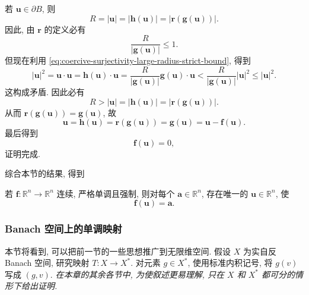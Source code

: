 \begin{Proof}
若 $\bm{u}\in\partial B$, 则
\begin{equation}\label{eq:coercive-surjectivity-boundary-fixed-point-norms}
R=|\bm{u}|=|\bm{h}(\bm{u})|=|\bm{r}(\bm{g}(\bm{u}))|.
\end{equation}
因此, 由 $\bm{r}$ 的定义必有
\begin{equation}\label{eq:coercive-surjectivity-boundary-radius-ratio}
\dfrac{R}{|\bm{g}(\bm{u})|}\leq1.
\end{equation}
但现在利用 \eqref{eq:coercive-surjectivity-large-radius-strict-bound}, 得到
\begin{equation}\label{eq:coercive-surjectivity-boundary-contradiction}
|\bm{u}|^2=\bm{u}\cdot\bm{u}=\bm{h}(\bm{u})\cdot\bm{u}=\dfrac{R}{|\bm{g}(\bm{u})|}\bm{g}(\bm{u})\cdot\bm{u}<\dfrac{R}{|\bm{g}(\bm{u})|}|\bm{u}|^2\leq|\bm{u}|^2.
\end{equation}
这构成矛盾. 因此必有
\begin{equation}\label{eq:coercive-surjectivity-interior-fixed-point-norms}
R>|\bm{u}|=|\bm{h}(\bm{u})|=|\bm{r}(\bm{g}(\bm{u}))|.
\end{equation}
从而 $\bm{r}(\bm{g}(\bm{u}))=\bm{g}(\bm{u})$, 故
\begin{equation}\label{eq:coercive-surjectivity-interior-retraction-identity}
\bm{u}=\bm{h}(\bm{u})=\bm{r}(\bm{g}(\bm{u}))=\bm{g}(\bm{u})=\bm{u}-\bm{f}(\bm{u}).
\end{equation}
最后得到
\begin{equation}\label{eq:coercive-surjectivity-zero-equation-conclusion}
\bm{f}(\bm{u})=0,
\end{equation}
证明完成.
\end{Proof}
\endgroup

综合本节的结果, 得到

\begin{Corollary}
\label{cor:finite-dimensional-coercive-strict-monotone-bijection}
若 $\bm{f}:\mathbb{R}^n\to\mathbb{R}^n$ 连续, 严格单调且强制, 则对每个 $\bm{a}\in\mathbb{R}^n$, 存在唯一的 $\bm{u}\in\mathbb{R}^n$, 使\[\bm{f}(\bm{u})=\bm{a}.\]
\end{Corollary}

\subsubsection{Banach 空间上的单调映射}\label{subsec:monotone-banach-mappings}

本节将看到, 可以把前一节的一些思想推广到无限维空间. 假设 $X$ 为实自反 Banach 空间, 研究映射 $T:X\to X^*$. 对元素 $g\in X^*$, 使用标准内积记号, 将 $g(v)$ 写成 $(g,v)$. \emph{在本章的其余各节中, 为使叙述更易理解, 只在 $X$ 和 $X^*$ 都可分的情形下给出证明.}

